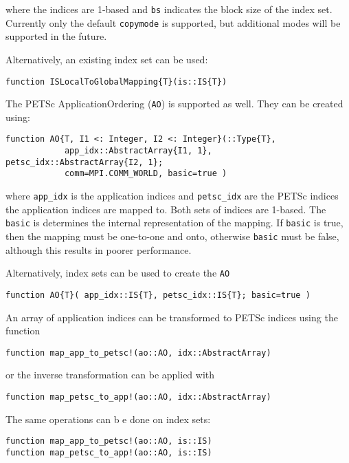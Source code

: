 \documentclass{article}
\begin{document}
\noindent where the indices are 1-based and \texttt{bs} indicates the block size of the 
index set.  Currently only the default \texttt{copymode} is supported,
but additional modes will be supported in the future.

Alternatively, an existing index set can be used:
\begin{verbatim}
function ISLocalToGlobalMapping{T}(is::IS{T})
\end{verbatim}

\hfill \break

The PETSc ApplicationOrdering (\texttt{AO}) is supported as well.
They can be created using:

\begin{verbatim}
function AO{T, I1 <: Integer, I2 <: Integer}(::Type{T}, 
            app_idx::AbstractArray{I1, 1}, petsc_idx::AbstractArray{I2, 1}; 
            comm=MPI.COMM_WORLD, basic=true )
\end{verbatim}

\noindent where \texttt{app\_idx} is the application indices and 
\texttt{petsc\_idx} are
the PETSc indices the application indices are mapped to.  Both sets of 
indices are 1-based.  The \texttt{basic} is determines the internal
representation of the mapping.  If \texttt{basic} is true, then
the mapping must be one-to-one and onto, otherwise \texttt{basic} must
be false, although this results in poorer performance.

Alternatively, index sets can be used to create the \texttt{AO}
\begin{verbatim}
function AO{T}( app_idx::IS{T}, petsc_idx::IS{T}; basic=true )
\end{verbatim}

\noindent An array of application indices can be transformed to PETSc indices using
the function

\begin{verbatim}
function map_app_to_petsc!(ao::AO, idx::AbstractArray)
\end{verbatim}

\noindent or the inverse transformation can be applied with

\begin{verbatim}
function map_petsc_to_app!(ao::AO, idx::AbstractArray)
\end{verbatim}

\noindent The same operations can b e done on index sets:

\begin{verbatim}
function map_app_to_petsc!(ao::AO, is::IS)
function map_petsc_to_app!(ao::AO, is::IS)
\end{verbatim}
\end{document}
